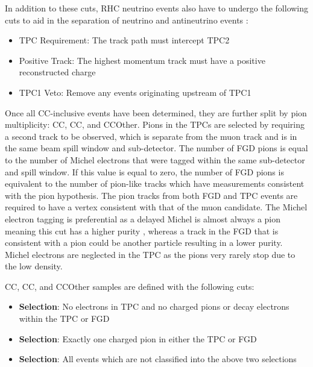 In addition to these cuts, RHC neutrino events also have to undergo the following cuts to aid in the separation of neutrino and antineutrino events \cite{t2k_tn_246}:

\begin{itemize}
\item TPC Requirement: The track path must intercept TPC2
\item Positive Track: The highest momentum track must have a positive reconstructed charge
\item TPC1 Veto: Remove any events originating upstream of TPC1
\end{itemize}

Once all CC-inclusive events have been determined, they are further split by pion multiplicity: CC\quickmath{0\pi}, CC\quickmath{1\pi}, and CCOther. Pions in the TPCs are selected by requiring a second track to be observed, which is separate from the muon track and is in the same beam spill window and sub-detector. The number of FGD pions is equal to the number of Michel electrons that were tagged within the same sub-detector and spill window. If this value is equal to zero, the number of FGD pions is equivalent to the number of pion-like tracks which have  measurements consistent with the pion hypothesis. The pion tracks from both FGD and TPC events are required to have a vertex consistent with that of the muon candidate. The Michel electron tagging is preferential as a delayed Michel is almost always a pion meaning this cut has a higher purity \cite{t2k_tn_104, t2k_tn_212}, whereas a track in the FGD that is consistent with a pion could be another particle resulting in a lower purity. Michel electrons are neglected in the TPC as the pions very rarely stop due to the low density.

CC\quickmath{0\pi}, CC\quickmath{1\pi}, and CCOther samples are defined with the following cuts:

\begin{itemize}
\item \textbf{ Selection}: No electrons in TPC and no charged pions or decay electrons within the TPC or FGD
\item \textbf{ Selection}: Exactly one charged pion in either the TPC or FGD
\item \textbf{ Selection}: All events which are not classified into the above two selections
\end{itemize}

